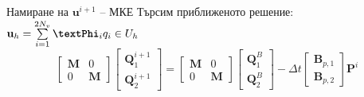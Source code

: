 \documentclass{beamer}
\newcommand{\vecf}[1]{\textbf{#1}}
\begin{document}
\begin{frame}{Намиране на $\textbf{u}^{i+1}$ -- МКЕ}
	Търсим приближеното решение: $\vecf{u}_h = \sum\limits_{i=1}^{2N_v}{\vecf{\textPhi}_iq_i} \in U_h$
	$$
	\begin{bmatrix}
		\mathbf{M} & 0 \\
		0 & \mathbf{M}
	\end{bmatrix} \begin{bmatrix}
		\vecf{Q}^{i+1}_1 \\
		\vecf{Q}^{i+1}_2
	\end{bmatrix} =	\begin{bmatrix}
		\mathbf{M} & 0 \\
		0 & \mathbf{M}
	\end{bmatrix} \begin{bmatrix}
		\vecf{Q}^{B}_1 \\
		\vecf{Q}^{B}_2
	\end{bmatrix} - \Delta t \begin{bmatrix}
		\vecf{B}_{p,1} \\
		\vecf{B}_{p,2}
	\end{bmatrix} \vecf{P}^i
	$$
\end{frame}
\iffalse
\end{document}
